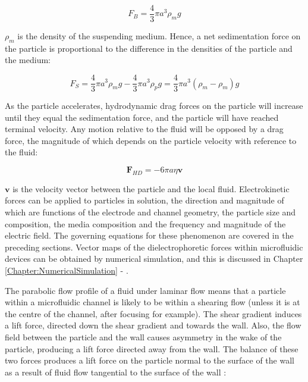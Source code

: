 \begin{equation}
 F_{B} = \frac{4}{3} \pi a^{3} \rho_{m} g
\label{eqn:buoyancy_force}
\end{equation}

$\rho_{m}$ is the density of the suspending medium. Hence, a net sedimentation force on the particle is proportional to the difference in the densities of the particle and the medium:

\begin{equation}
 F_{S} = \frac{4}{3} \pi a^{3} \rho_{m} g - \frac{4}{3} \pi a^{3} \rho_{p} g  = \frac{4}{3} \pi a^{3} (\rho_{m} - \rho_{m}) g
\label{eqn:sedimentation_force}
\end{equation}

As the particle accelerates, hydrodynamic drag forces on the particle will increase until they equal the sedimentation force, and the particle will have reached terminal velocity. Any motion relative to the fluid will be opposed by a drag force, the magnitude of which depends on the particle velocity with reference to the fluid:

\begin{equation}
\textbf{F}_{HD}= -6 \pi a \eta \textbf{v}
 \label{eqn:stokes_law}
\end{equation}

$\textbf{v}$ is the velocity vector between the particle and the local fluid. Electrokinetic forces can be applied to particles in solution, the direction and magnitude of which are functions of the electrode and channel geometry, the particle size and composition, the media composition and the frequency and magnitude of the electric field. The governing equations for these phenomenon are covered in the preceding sections. Vector maps of the dielectrophoretic forces within microfluidic devices can be obtained by numerical simulation, and this is discussed in Chapter \ref{Chapter:NumericalSimulation} - .

The parabolic flow profile of a fluid under laminar flow means that a particle within a microfluidic channel is likely to be within a shearing flow (unless it is at the centre of the channel, after focusing for example). The shear gradient induces a lift force, directed down the shear gradient and towards the wall. Also, the flow field between the particle and the wall causes asymmetry in the wake of the particle, producing a lift force directed away from the wall. The balance of these two forces produces a lift force on the particle normal to the surface of the wall as a result of fluid flow tangential to the surface of the wall \citep{DiCarlo:2007,Asmolov:1999}:

